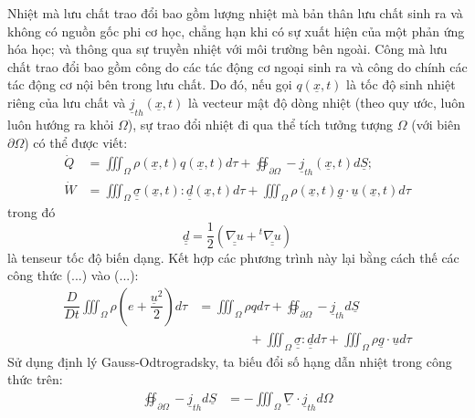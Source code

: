 \documentclass[../../../main.tex]{subfiles}
\begin{document}
    Nhiệt mà lưu chất trao đổi bao gồm lượng nhiệt mà bản thân lưu chất sinh ra và không có nguồn gốc phi cơ học, chẳng hạn khi có sự xuất hiện của một phản ứng hóa học; và thông qua sự truyền nhiệt với môi trường bên ngoài. Công mà lưu chất trao đổi bao gồm công do các tác động cơ ngoại sinh ra và công do chính các tác động cơ nội bên trong lưu chất. Do đó, nếu gọi $q\left(\underline{x},t\right)$ là tốc độ sinh nhiệt riêng của lưu chất và $\underline{j}_{th}\left(\underline{x},t\right)$ là vecteur mật độ dòng nhiệt (theo quy ước, luôn luôn hướng ra khỏi $\Omega$), sự trao đổi nhiệt đi qua thể tích tưởng tượng $\Omega$ (với biên $\partial\Omega$) có thể được viết:
    \begin{align}
        \dot{Q}&=\iiint_{\Omega}\rho\left(\underline{x},t\right)q\left(\underline{x},t\right)d\tau+\oiint_{\partial\Omega}-\underline{j}_{th}\left(\underline{x},t\right)d\underline{S};\\
        \dot{W}&=\iiint_{\Omega}\underline{\underline{\sigma}}\left(\underline{x},t\right)\colon\underline{\underline{d}}\left(\underline{x},t\right)d\tau+\iiint_{\Omega}\rho\left(\underline{x},t\right)\underline{g}\cdot\underline{u}\left(\underline{x},t\right)d\tau
    \end{align}
    trong đó
        \[
            \underline{\underline{d}}=\dfrac{1}{2}\left(\underline{\underline{\nabla u}} +{}^t\underline{\underline{\nabla u}}\right)
        \]
    là tenseur tốc độ biến dạng. Kết hợp các phương trình này lại bằng cách thế các công thức (...) vào (...):
        \[
            \begin{aligned}
                \dfrac{D}{Dt}\iiint_{\Omega}\rho\left(e+\dfrac{\underline{u}^2}{2}\right)d\tau&=\iiint_{\Omega}\rho qd\tau+\oiint_{\partial\Omega}-\underline{j}_{th}d\underline{S}\\
                &\qquad\qquad+\iiint_{\Omega}\underline{\underline{\sigma}}\colon\underline{\underline{d}}d\tau+\iiint_{\Omega}\rho\underline{g}\cdot\underline{u}d\tau
            \end{aligned}
        \]
    Sử dụng định lý Gauss-Odtrogradsky, ta biếu đổi số hạng dẫn nhiệt trong công thức trên:
        \[
            \begin{aligned}
                \oiint_{\partial\Omega}-\underline{j}_{th}d\underline{S}&=-\iiint_{\Omega}\underline{\nabla}\cdot\underline{j}_{th}d\Omega
            \end{aligned}
        \]
\end{document}
